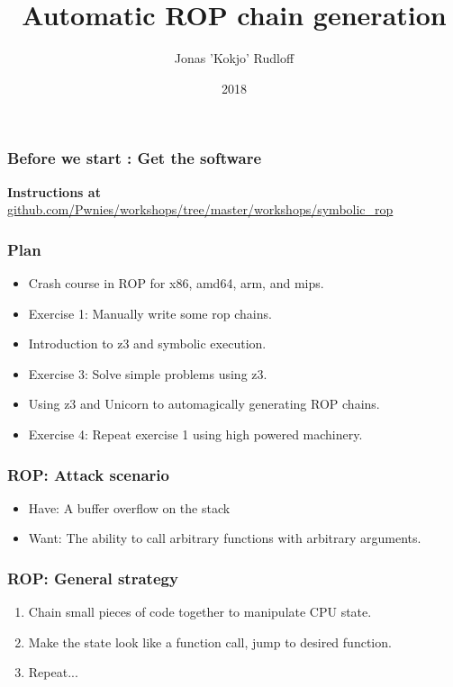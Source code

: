 \documentclass{beamer}
\title{Automatic ROP chain generation}
\author{Jonas 'Kokjo' Rudloff }
\institute{Pwnies @ Copenhagen University}
\date{2018}
\begin{document}
\frame{\titlepage}


\begin{frame}
    \frametitle{Before we start : Get the software}
    \textbf{Instructions at} \\
    {\small \url{github.com/Pwnies/workshops/tree/master/workshops/symbolic\_rop}}
\end{frame}


\begin{frame}
    \frametitle{Plan}
    \begin{itemize}
        \item Crash course in ROP for x86, amd64, arm, and mips.
        \item Exercise 1: Manually write some rop chains.
        \item Introduction to z3 and symbolic execution.
        \item Exercise 3: Solve simple problems using z3.
        \item Using z3 and Unicorn to automagically generating ROP chains.
        \item Exercise 4: Repeat exercise 1 using high powered machinery.
    \end{itemize}
\end{frame}


\begin{frame}
    \frametitle{ROP: Attack scenario}
    \begin{itemize}
        \pause \item Have: A buffer overflow on the stack
        \pause \item Want: The ability to call arbitrary functions with arbitrary arguments.
    \end{itemize}
\end{frame}


\begin{frame}
    \frametitle{ROP: General strategy}
    \begin{enumerate}
        \pause \item Chain small pieces of code together to manipulate CPU state.
        \pause \item Make the state look like a function call, jump to desired function.
        \pause \item Repeat...
    \end{enumerate}
\end{frame}
\end{document}
